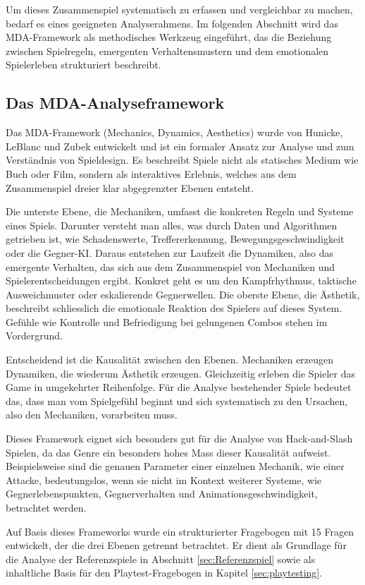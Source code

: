 \documentclass[10pt, a4paper]{article}
\begin{document}
Um dieses Zusammenspiel systematisch zu erfassen und vergleichbar zu machen, bedarf es eines geeigneten Analyserahmens. Im folgenden Abschnitt wird das MDA-Framework als methodisches Werkzeug eingeführt, das die Beziehung zwischen Spielregeln, emergenten Verhaltensmustern und dem emotionalen Spielerleben strukturiert beschreibt.

\subsection{Das MDA-Analyseframework}

Das MDA-Framework (Mechanics, Dynamics, Aesthetics) wurde von Hunicke, LeBlanc und Zubek entwickelt und ist ein formaler Ansatz zur Analyse und zum Verständnis von Spieldesign. Es beschreibt Spiele nicht als statisches Medium wie Buch oder Film, sondern als interaktives Erlebnis, welches aus dem Zusammenspiel dreier klar abgegrenzter Ebenen entsteht.

Die unterste Ebene, die Mechaniken, umfasst die konkreten Regeln und Systeme eines Spiels. Darunter versteht man alles, was durch Daten und Algorithmen getrieben ist, wie Schadenswerte, Treffererkennung, Bewegungsgeschwindigkeit oder die Gegner-KI. Daraus entstehen zur Laufzeit die Dynamiken, also das emergente Verhalten, das sich aus dem Zusammenspiel von Mechaniken und Spielerentscheidungen ergibt. Konkret geht es um den Kampfrhythmus, taktische Ausweichmuster oder eskalierende Gegnerwellen. Die oberste Ebene, die Ästhetik, beschreibt schliesslich die emotionale Reaktion des Spielers auf dieses System. Gefühle wie Kontrolle und Befriedigung bei gelungenen Combos stehen im Vordergrund.

Entscheidend ist die Kausalität zwischen den Ebenen. Mechaniken erzeugen Dynamiken, die wiederum Ästhetik erzeugen. Gleichzeitig erleben die Spieler das Game in umgekehrter Reihenfolge. Für die Analyse bestehender Spiele bedeutet das, dass man vom Spielgefühl beginnt und sich systematisch zu den Ursachen, also den Mechaniken, vorarbeiten muss.

Dieses Framework eignet sich besonders gut für die Analyse von Hack-and-Slash Spielen, da das Genre ein besonders hohes Mass dieser Kausalität aufweist. Beispielsweise sind die genauen Parameter einer einzelnen Mechanik, wie einer Attacke, bedeutungslos, wenn sie nicht im Kontext weiterer Systeme, wie Gegnerlebenspunkten, Gegnerverhalten und Animationsgeschwindigkeit, betrachtet werden.\autocite{hunicke2004mda}

Auf Basis dieses Frameworks wurde ein strukturierter Fragebogen mit 15 Fragen entwickelt, der die drei Ebenen getrennt betrachtet. Er dient als Grundlage für die Analyse der Referenzspiele in Abschnitt \ref{sec:Referenzspiel} sowie als inhaltliche Basis für den Playtest-Fragebogen in Kapitel \ref{sec:playtesting}.
\end{document}
